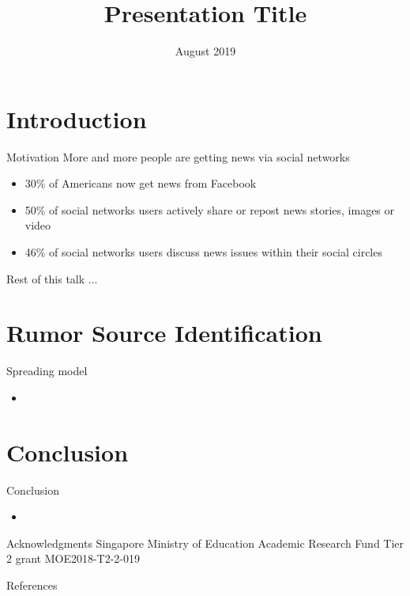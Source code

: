 \documentclass[10pt,xcolor=table,dvipsnames]{beamer}
\title{Presentation Title}    %
\author[W. P. Tay]{Wee Peng Tay\texorpdfstring{\\[3mm] \footnotesize  
xxx \and xxx}{}}               %
\institute[NTU]{Nanyang Technological University}       %
\date{August 2019}                    %
\begin{document}
\begin{frame}
  \titlepage
\end{frame}


\section*{Introduction}

\begin{frame}{Motivation}
    More and more people are getting news via social networks 
    \begin{itemize}
        \item 30\% of Americans now get news from Facebook
        \item 50\% of social networks users actively share or repost news stories, images or video
        \item 46\% of social networks users discuss news issues within their social circles
    \end{itemize}
\end{frame}



\begin{frame}{Rest of this talk ...}
\tableofcontents
\end{frame}

\section{Rumor Source Identification}

\begin{frame}{Spreading model}
	\begin{itemize}[<+->]
			\item 
	\end{itemize}
\end{frame}


\section{Conclusion}

\begin{frame}{Conclusion}
  \begin{itemize}[<+->]
		\item 
	\end{itemize}
\end{frame}


\begin{frame}{Acknowledgments}
Singapore Ministry of Education Academic Research Fund Tier 2 grant MOE2018-T2-2-019
\end{frame}


\begin{frame}{}
	\begin{center}
	\end{center}
\end{frame}

\begin{frame}[allowframebreaks]{References}
\AtNextBibliography{\small}
\printbibliography
\end{frame}
\end{document}
